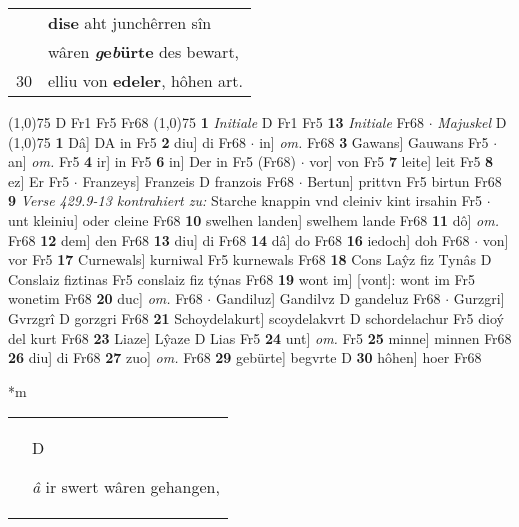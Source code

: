 \documentclass[8pt,a4paper,notitlepage]{article}
\begin{document}
\begin{table}[ht]
\begin{minipage}[t]{0.5\linewidth}
\begin{tabular}{rl}
 & \textbf{dise} aht junchêrren sîn\\ 
 & wâren \textbf{\textit{g}e\textit{b}ürte} des bewart,\\ 
30 & elliu von \textbf{edeler}, hôhen art.\\ 
\end{tabular}
\scriptsize
\line(1,0){75} \newline
D Fr1 Fr5 Fr68 \newline
\line(1,0){75} \newline
\textbf{1} \textit{Initiale} D Fr1 Fr5  \textbf{13} \textit{Initiale} Fr68   $\cdot$ \textit{Majuskel} D  \newline
\line(1,0){75} \newline
\textbf{1} Dâ] DA in Fr5 \textbf{2} diu] di Fr68  $\cdot$ in] \textit{om.} Fr68 \textbf{3} Gawans] Gauwans Fr5  $\cdot$ an] \textit{om.} Fr5 \textbf{4} ir] in Fr5 \textbf{6} in] Der in Fr5 (Fr68)  $\cdot$ vor] von Fr5 \textbf{7} leite] leit Fr5 \textbf{8} ez] Er Fr5  $\cdot$ Franzeys] Franzeis D franzois Fr68  $\cdot$ Bertun] prittvn Fr5 birtun Fr68 \textbf{9} \textit{Verse 429.9-13 kontrahiert zu:} Starche knappin vnd cleiniv kint irsahin Fr5   $\cdot$ unt kleiniu] oder cleine Fr68 \textbf{10} swelhen landen] swelhem lande Fr68 \textbf{11} dô] \textit{om.} Fr68 \textbf{12} dem] den Fr68 \textbf{13} diu] di Fr68 \textbf{14} dâ] do Fr68 \textbf{16} iedoch] doh Fr68  $\cdot$ von] vor Fr5 \textbf{17} Curnewals] kurniwal Fr5 kurnewals Fr68 \textbf{18} Cons Laŷz fiz Tynâs D Conslaiz fiztinas Fr5 conslaiz fiz týnas Fr68 \textbf{19} wont im] [vont]: wont im Fr5 wonetim Fr68 \textbf{20} duc] \textit{om.} Fr68  $\cdot$ Gandiluz] Gandilvz D gandeluz Fr68  $\cdot$ Gurzgri] Gvrzgrî D gorzgri Fr68 \textbf{21} Schoydelakurt] scoydelakvrt D schordelachur Fr5 dioý del kurt Fr68 \textbf{23} Liaze] Lŷaze D Lias Fr5 \textbf{24} unt] \textit{om.} Fr5 \textbf{25} minne] minnen Fr68 \textbf{26} diu] di Fr68 \textbf{27} zuo] \textit{om.} Fr68 \textbf{29} gebürte] begvrte D \textbf{30} hôhen] hoer Fr68 \newline
\end{minipage}
\hspace{0.5cm}
\begin{minipage}[t]{0.5\linewidth}
\small
\begin{center}*m
\end{center}
\begin{tabular}{rl}
 & \begin{large}D\end{large}\textit{â} ir swert wâren gehangen,\\ 

\end{tabular}
\end{minipage}
\end{table}
\end{document}
